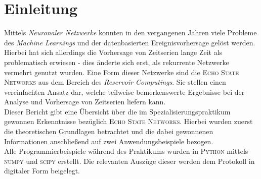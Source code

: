 \section{Einleitung}
Mittels \textit{Neuronaler Netzwerke} konnten in den vergangenen Jahren viele Probleme des \textit{Machine Learnings} und der datenbasierten Ereignisvorhersage gelöst werden. Hierbei hat sich allerdings die Vorhersage von Zeitserien lange Zeit als problematisch erwiesen - dies änderte sich erst, als rekurrente Netzwerke vermehrt genutzt wurden. Eine Form dieser Netzwerke sind die \textsc{Echo State Networks} aus dem Bereich des \textit{Reservoir Computings}. Sie stellen einen vereinfachten Ansatz dar, welche teilweise bemerkenswerte Ergebnisse bei der Analyse und Vorhersage von Zeitserien liefern kann.\\  

Dieser Bericht gibt eine Übersicht über die im Spezialisierungspraktikum gewonnen Erkenntnisse bezüglich \textsc{Echo State Networks}. Hierbei wurden zuerst die theoretischen Grundlagen betrachtet und die dabei gewonnenen Informationen anschließend auf zwei Anwendungsbeispiele bezogen.\\

Alle Programmierbeispiele während des Praktikums wurden in \textsc{Python} mittels \textsc{numpy} und \textsc{scipy} erstellt. Die relevanten Auszüge dieser werden dem Protokoll in digitaler Form beigelegt.